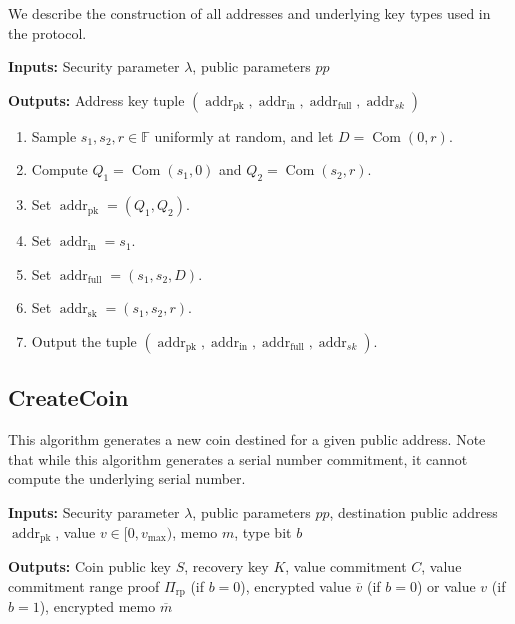 \documentclass{llncs}
\newcommand{\F}{\mathbb{F}}
\newcommand{\addr}{\operatorname{addr}}
\newcommand{\com}{\operatorname{Com}}
\begin{document}
We describe the construction of all addresses and underlying key types used in the protocol.

\textbf{Inputs:} Security parameter $\lambda$, public parameters $pp$

\textbf{Outputs:} Address key tuple $(\addr_{\text{pk}}, \addr_{\text{in}}, \addr_{\text{full}}, \addr_{sk})$

\begin{enumerate}
\item Sample $s_1, s_2, r \in \F$ uniformly at random, and let $D = \com(0, r)$.
\item Compute $Q_1 = \com(s_1, 0)$ and $Q_2 = \com(s_2, r)$.
\item Set $\addr_{\text{pk}} = (Q_1, Q_2)$.
\item Set $\addr_{\text{in}} = s_1$.
\item Set $\addr_{\text{full}} = (s_1, s_2, D)$.
\item Set $\addr_{\text{sk}} = (s_1, s_2, r)$.
\item Output the tuple $(\addr_{\text{pk}}, \addr_{\text{in}}, \addr_{\text{full}}, \addr_{sk})$.
\end{enumerate}


\subsection{CreateCoin}

This algorithm generates a new coin destined for a given public address.
Note that while this algorithm generates a serial number commitment, it cannot compute the underlying serial number.

\textbf{Inputs:} Security parameter $\lambda$, public parameters $pp$, destination public address $\addr_{\text{pk}}$, value $v \in [0, v_{\text{max}})$, memo $m$, type bit $b$

\textbf{Outputs:} Coin public key $S$, recovery key $K$, value commitment $C$, value commitment range proof $\Pi_{\text{rp}}$ (if $b=0$), encrypted value $\overline{v}$ (if $b=0$) or value $v$ (if $b=1$), encrypted memo $\overline{m}$
\end{document}
